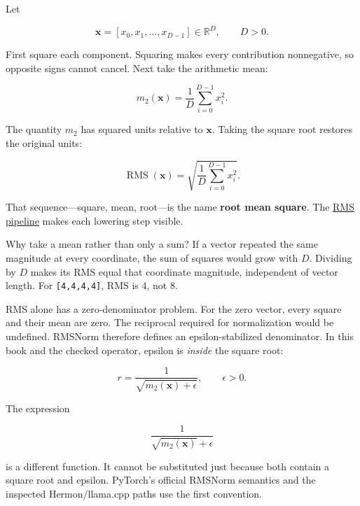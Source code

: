 Let

\begin{equation}
\mathbf{x}=[x_0,x_1,\ldots,x_{D-1}]\in\mathbb{R}^{D},
\qquad D>0.
\end{equation}

First square each component. Squaring makes every contribution
nonnegative, so opposite signs cannot cancel. Next take the arithmetic
mean:

\begin{equation}
m_2(\mathbf{x})=\frac{1}{D}\sum_{i=0}^{D-1}x_i^2.
\end{equation}

The quantity \(m_2\) has squared units relative to \(\mathbf{x}\).
Taking the square root restores the original units:

\begin{equation}
\operatorname{RMS}(\mathbf{x})
=\sqrt{\frac{1}{D}\sum_{i=0}^{D-1}x_i^2}.
\end{equation}

That sequence---square, mean, root---is the name \textbf{root mean
square}. The
\href{https://github.com/hermonai/inside-the-llm-engine/blob/astra-visual-rewrite/diagrams/transformer/rms-calculation-pipeline.txt}{RMS
pipeline} makes each lowering step visible.

Why take a mean rather than only a sum? If a vector repeated the same
magnitude at every coordinate, the sum of squares would grow with \(D\).
Dividing by \(D\) makes its RMS equal that coordinate magnitude,
independent of vector length. For \texttt{{[}4,4,4,4{]}}, RMS is 4, not
8.

RMS alone has a zero-denominator problem. For the zero vector, every
square and their mean are zero. The reciprocal required for
normalization would be undefined. RMSNorm therefore defines an
epsilon-stabilized denominator. In this book and the checked operator,
epsilon is \emph{inside} the square root:

\begin{equation}
r=\frac{1}{\sqrt{m_2(\mathbf{x})+\epsilon}},
\qquad \epsilon>0.
\end{equation}

The expression

\begin{equation}
\frac{1}{\sqrt{m_2(\mathbf{x})}+\epsilon}
\end{equation}

is a different function. It cannot be substituted just because both
contain a square root and epsilon. PyTorch's official RMSNorm semantics
and the inspected Hermon/llama.cpp paths use the first convention.

